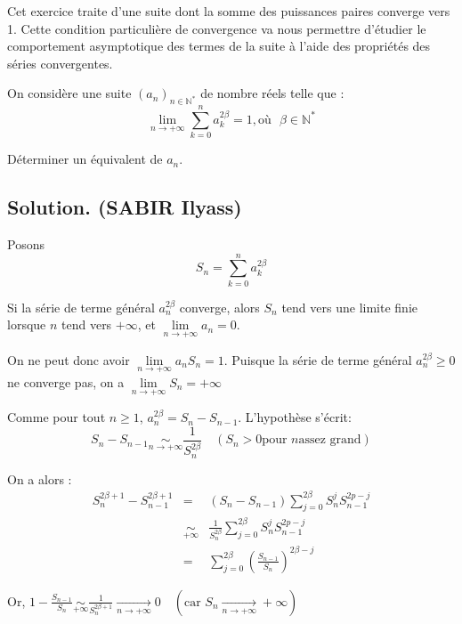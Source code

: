 Cet exercice traite d'une suite dont la somme des puissances paires converge
vers 1. Cette condition particuli{\`e}re de convergence va nous permettre
d'{\'e}tudier le comportement asymptotique des termes de la suite {\`a} l'aide
des propri{\'e}t{\'e}s des s{\'e}ries convergentes.

\begin{exercise}[]
On consid{\`e}re une suite $(a_n)_{n \in \mathbb{N}^{\ast}}$ de nombre
r{\'e}els telle que :
\[ \underset{n \to + \infty}{\lim}  \sum_{k = 0}^n a^{2 \beta}_k = 1,
   \text{o{\`u} } \beta \in \mathbb{N}^{\ast} \]


D{\'e}terminer un {\'e}quivalent de $a_n$.

\end{exercise}

\subsection*{Solution. (SABIR Ilyass)}

Posons
\[ S_n = \sum_{k = 0}^n a^{2 \beta}_k \]


Si la s{\'e}rie de terme g{\'e}n{\'e}ral $a_n^{2 \beta}$ converge, alors $S_n$
tend vers une limite finie lorsque $n$ tend vers $+ \infty$, et $\underset{n
\rightarrow + \infty}{\lim} a_n = 0$.

On ne peut donc avoir $\underset{n \to + \infty}{\lim} {a_n}  S_n = 1$.
Puisque la s{\'e}rie de terme g{\'e}n{\'e}ral $a_n^{2 \beta} \geqslant 0$ ne
converge pas, on a $\underset{n \to + \infty}{\lim } S_n = + \infty$

Comme pour tout $n \geq 1$, $a_n^{2 \beta} = S_n - S_{n - 1}$. L'hypoth{\`e}se
s'{\'e}crit:
\[ S_n - S_{n - 1} \underset{n \to + \infty}{\sim} \frac{1}{S_n^{2 \beta}} 
   \quad (S_n > 0 \text{pour } n \text{assez grand}) \]


On a alors :
\begin{eqnarray*}
  S_n^{2 \beta + 1} - S_{n - 1}^{2 \beta + 1} & = &  (S_n - S_{n - 1}) 
  \sum_{j = 0}^{2 \beta} S_n^j S_{n - 1}^{2 p - j}\\
  & \underset{+ \infty}{\sim} & \frac{1}{S_n^{2 \beta}}  \sum_{j = 0}^{2
  \beta} S_n^j S_{n - 1}^{2 p - j}\\
  & = & \sum_{j = 0}^{2 \beta} \left( \frac{S_{n - 1}}{S_n} \right)^{2 \beta
  - j}
\end{eqnarray*}


Or, $1 - \frac{S_{n - 1}}{S_n} \underset{+ \infty}{\sim} \frac{1}{S_n^{2 \beta
+ 1}} \underset{n \to + \infty}{\to} 0 \quad (\text{car } S_n \underset{n \to
+ \infty}{\to} + \infty)$


